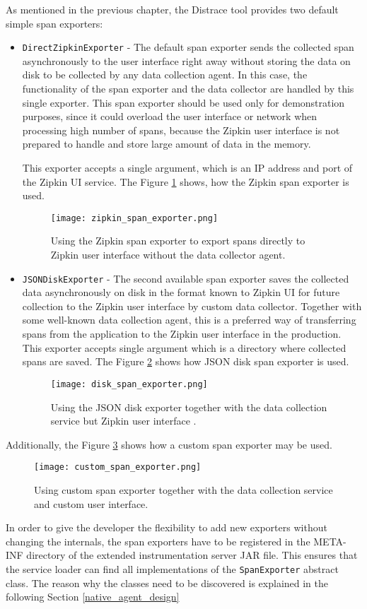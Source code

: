 As mentioned in the previous chapter, the Distrace tool provides two default simple span exporters:
\begin{itemize}
	\item  \texttt{DirectZipkinExporter} - The default span exporter sends the collected span asynchronously to the user interface right away without storing the data on disk to be collected by any data collection agent. In this case, the functionality of the span exporter and the data collector are handled by this single exporter. 
	This span exporter should be used only for demonstration purposes, since it could overload the user interface or network when processing high number of spans, because the Zipkin user interface is not prepared to handle and store large amount of data in the memory. 
	
	This exporter accepts a single argument, which is an IP address and port of the Zipkin UI service. The Figure \ref{fig:zipkin_span_exporter} shows, how the Zipkin span exporter is used.
	
	\begin{figure}
		\centering
		\texttt{[image: zipkin\_span\_exporter.png]}
		\caption{Using the Zipkin span exporter to export spans directly to Zipkin user interface without the data collector agent.}
		\label{fig:zipkin_span_exporter}
	\end{figure}
	\item  \texttt{JSONDiskExporter} - The second available span exporter saves the collected data asynchronously on disk in the format known to Zipkin UI for future collection to the Zipkin user interface by custom data collector. Together with some well-known data collection agent, this is a preferred way of transferring spans from the application to the Zipkin user interface in the production. This exporter accepts single argument which is a directory where collected spans are saved. The Figure \ref{fig:disk_span_exporter} shows how JSON disk span exporter is used.
	\begin{figure}
		\centering
		\texttt{[image: disk\_span\_exporter.png]}
		\caption{Using the JSON disk exporter together with the data collection service but Zipkin user interface .}
		\label{fig:disk_span_exporter}
	\end{figure}
\end{itemize}
Additionally, the Figure \ref{fig:custom_span_exporter} shows how a custom span exporter may be used.

\begin{figure}
	\centering
	\texttt{[image: custom\_span\_exporter.png]}
	\caption{Using custom span exporter together with the data collection service and custom user interface.}
	\label{fig:custom_span_exporter}
\end{figure}
In order to give the developer the flexibility to add new exporters without changing the internals, the span exporters have to be  registered in the META-INF directory of the extended instrumentation server JAR file. This ensures that the service loader can find all implementations of the \texttt{SpanExporter} abstract class. The reason why the classes need to be discovered is explained in the following Section \ref{native_agent_design}

